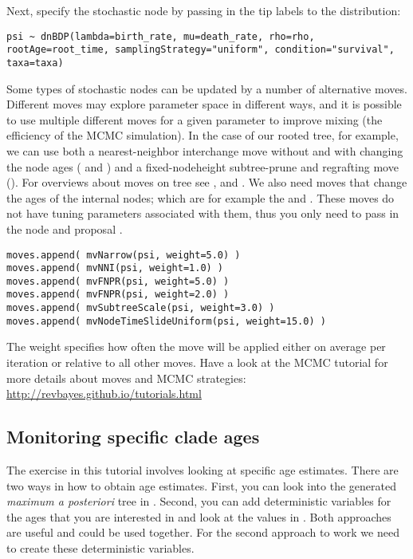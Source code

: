 Next, specify the  stochastic node by passing in the tip labels  to the  distribution:
{\tt \begin{snugshade*}
\begin{lstlisting}
psi ~ dnBDP(lambda=birth_rate, mu=death_rate, rho=rho, rootAge=root_time, samplingStrategy="uniform", condition="survival", taxa=taxa)
\end{lstlisting}
\end{snugshade*}}

Some types of stochastic nodes can be updated by a number of alternative moves. 
Different moves may explore parameter space in different ways, and it is possible to use multiple different moves for a given parameter to improve mixing (the efficiency of the MCMC simulation). 
In the case of our rooted tree, for example, we can use both a nearest-neighbor interchange move without and with changing the node ages ( and ) and a fixed-nodeheight subtree-prune and regrafting move (). 
For overviews about moves on tree see \cite{Lakner2008}, \cite{Hoehna2008} and \cite{Hoehna2012}.
We also need moves that change the ages of the internal nodes; which are for example the  and .
These moves do not have tuning parameters associated with them, thus you only need to pass in the  node and proposal . 
{\tt \begin{snugshade*}
\begin{lstlisting}
moves.append( mvNarrow(psi, weight=5.0) )
moves.append( mvNNI(psi, weight=1.0) )
moves.append( mvFNPR(psi, weight=5.0) )
moves.append( mvFNPR(psi, weight=2.0) )
moves.append( mvSubtreeScale(psi, weight=3.0) )
moves.append( mvNodeTimeSlideUniform(psi, weight=15.0) )
\end{lstlisting}
\end{snugshade*}}
The weight specifies how often the move will be applied either on average per iteration or relative to all other moves.
Have a look at the MCMC tutorial for more details about moves and MCMC strategies: \href{http://revbayes.github.io/tutorials.html}{http://revbayes.github.io/tutorials.html}

\subsection{Monitoring specific clade ages}

The exercise in this tutorial involves looking at specific age estimates.
There are two ways in \RevBayes how to obtain age estimates.
First, you can look into the generated \emph{maximum a posteriori} tree in \FigTree.
Second, you can add deterministic variables for the ages that you are interested in and look at the values in \Tracer.
Both approaches are useful and could be used together.
For the second approach to work we need to create these deterministic variables.

